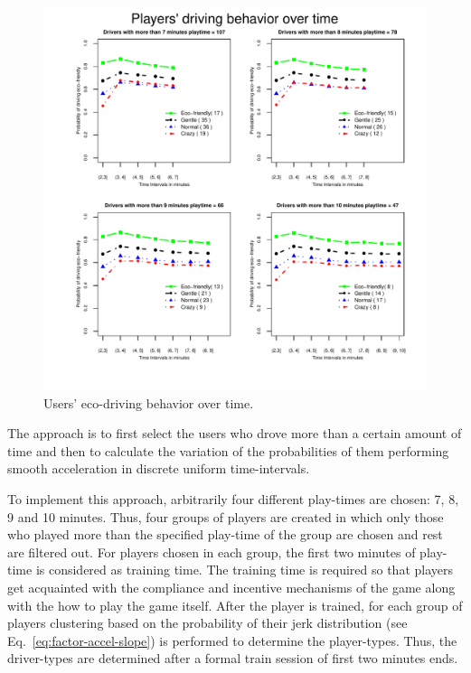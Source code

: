 \documentclass[preprint,authoryear,12pt]{elsarticle}
\begin{document}
\begin{figure}[!tb]
	\centering
	\includegraphics[width=1\linewidth]{ijhcs14-img/Evolution.pdf}
	\caption{Users' eco-driving behavior over time. 
}
	\label{fig:evolution}
\end{figure}


The approach is to first select the users who drove more than a certain amount of time and then to calculate the variation of the probabilities of them performing smooth acceleration in discrete uniform time-intervals.

To implement this approach, arbitrarily four different play-times are chosen: 7, 8, 9 and 10 minutes. Thus, four groups of players are created in which only those who played more than the specified play-time of the group are chosen and rest are filtered out.  For  players chosen in each group, the first two minutes of play-time is considered as training time. The training time is required so that players get acquainted with the compliance and incentive mechanisms of the game along with the how to play the game itself. After the player is trained, for each group of players clustering based on the probability of their jerk distribution (see Eq.~\ref{eq:factor-accel-slope}) is performed to determine the player-types.
Thus, the driver-types are determined  after a formal train session of first two minutes ends. 
\end{document}
